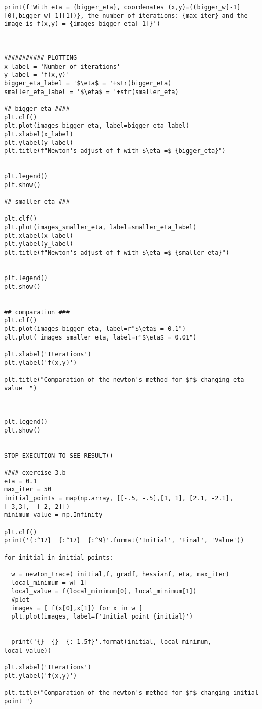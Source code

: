 \begin{verbatim}
print(f'With eta = {bigger_eta}, coordenates (x,y)={(bigger_w[-1][0],bigger_w[-1][1])}, the number of iterations: {max_iter} and the image is f(x,y) = {images_bigger_eta[-1]}')



########### PLOTTING
x_label = 'Number of iterations'
y_label = 'f(x,y)'
bigger_eta_label = '$\eta$ = '+str(bigger_eta)
smaller_eta_label = '$\eta$ = '+str(smaller_eta)

## bigger eta ####
plt.clf()
plt.plot(images_bigger_eta, label=bigger_eta_label)
plt.xlabel(x_label)
plt.ylabel(y_label)
plt.title(f"Newton's adjust of f with $\eta =$ {bigger_eta}")


plt.legend()
plt.show()

## smaller eta ###

plt.clf()
plt.plot(images_smaller_eta, label=smaller_eta_label)
plt.xlabel(x_label)
plt.ylabel(y_label)
plt.title(f"Newton's adjust of f with $\eta =$ {smaller_eta}")


plt.legend()
plt.show()


## comparation ###
plt.clf()
plt.plot(images_bigger_eta, label=r"$\eta$ = 0.1")
plt.plot( images_smaller_eta, label=r"$\eta$ = 0.01")

plt.xlabel('Iterations')
plt.ylabel('f(x,y)')

plt.title("Comparation of the newton's method for $f$ changing eta value  ")



plt.legend()
plt.show()


STOP_EXECUTION_TO_SEE_RESULT()

#### exercise 3.b
eta = 0.1
max_iter = 50
initial_points = map(np.array, [[-.5, -.5],[1, 1], [2.1, -2.1], [-3,3],  [-2, 2]])
minimum_value = np.Infinity

plt.clf()
print('{:^17}  {:^17}  {:^9}'.format('Initial', 'Final', 'Value'))

for initial in initial_points:
 
  w = newton_trace( initial,f, gradf, hessianf, eta, max_iter)
  local_minimum = w[-1]
  local_value = f(local_minimum[0], local_minimum[1])
  #plot
  images = [ f(x[0],x[1]) for x in w ]
  plt.plot(images, label=f'Initial point {initial}')
  

  print('{}  {}  {: 1.5f}'.format(initial, local_minimum, local_value))

plt.xlabel('Iterations')
plt.ylabel('f(x,y)')

plt.title("Comparation of the newton's method for $f$ changing initial point ")




\end{verbatim}
